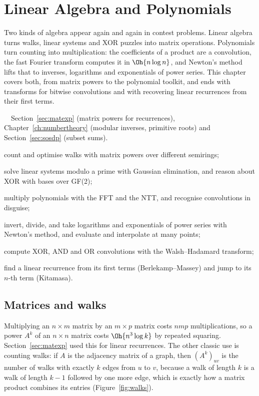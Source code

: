 \chapter{Linear Algebra and Polynomials}\label{ch:linalg}

Two kinds of algebra appear again and again in contest problems. Linear algebra turns walks, linear systems and XOR puzzles into
matrix operations. Polynomials turn counting into multiplication: the coefficients of a product are a convolution, the fast Fourier
transform computes it in $\Oh{n \log n}$, and Newton's method lifts that to inverses, logarithms and exponentials of power series.
This chapter covers both, from matrix powers to the polynomial toolkit, and ends with transforms for bitwise convolutions and with
recovering linear recurrences from their first terms.

\begin{chapterintro}{\gold\ \plat\ \ioi}{Section~\ref{sec:matexp} (matrix powers for recurrences), Chapter~\ref{ch:numbertheory}
(modular inverses, primitive roots) and Section~\ref{sec:sosdp} (subset sums).}
  \item count and optimise walks with matrix powers over different semirings;
  \item solve linear systems modulo a prime with Gaussian elimination, and reason about XOR with bases over GF(2);
  \item multiply polynomials with the FFT and the NTT, and recognise convolutions in disguise;
  \item invert, divide, and take logarithms and exponentials of power series with Newton's method, and evaluate and interpolate at many
        points;
  \item compute XOR, AND and OR convolutions with the Walsh--Hadamard transform;
  \item find a linear recurrence from its first terms (Berlekamp--Massey) and jump to its $n$-th term (Kitamasa).
\end{chapterintro}

\section[Matrices and walks]{Matrices and walks \hfill \gold}\label{sec:matrices}

Multiplying an $n \times m$ matrix by an $m \times p$ matrix costs $nmp$ multiplications, so a power $A^k$ of an $n \times n$ matrix
costs $\Oh{n^3 \log k}$ by repeated squaring. Section~\ref{sec:matexp} used this for linear recurrences. The other classic use is
counting walks: if $A$ is the adjacency matrix of a graph, then $(A^k)_{uv}$ is the number of walks with exactly $k$ edges from $u$ to
$v$, because a walk of length $k$ is a walk of length $k - 1$ followed by one more edge, which is exactly how a matrix product combines
its entries (Figure~\ref{fig:walks}).

